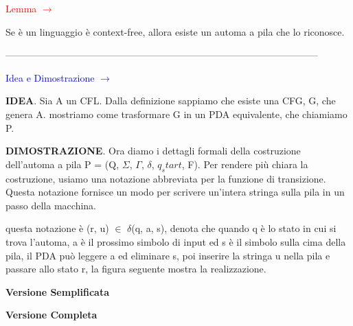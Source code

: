 \documentclass{article}
\begin{document}
\begin{center}
    \textcolor{red}{Lemma $\rightarrow$}
\end{center}

Se è un linguaggio è context-free, allora esiste un automa a pila che lo
riconosce.

--------------------------------------------------------------------------------------------------

\textcolor{blue}{Idea e Dimostrazione $\rightarrow$}

\textbf{IDEA}. Sia A un CFL. Dalla definizione sappiamo che esiste una CFG, G,
che genera A. mostriamo come trasformare G in un PDA equivalente, che chiamiamo
P.

\textbf{DIMOSTRAZIONE}. Ora diamo i dettagli formali della costruzione
\\dell'automa a pila P = (Q, $\Sigma$, $\Gamma$, $\delta$, $q_start$, F). Per
rendere più chiara la costruzione, usiamo una notazione abbreviata per la
funzione di transizione. Questa notazione fornisce un modo per scrivere
un'intera stringa sulla pila in un passo della macchina.

questa notazione è (r, u) $\in$ $\delta$(q, a, s), denota che quando q è lo
stato in cui si trova l'automa, a è il prossimo simbolo di input ed s è il
simbolo sulla cima della pila, il PDA può leggere a ed eliminare s, poi inserire
la stringa u nella pila e passare allo stato r, la figura seguente mostra la
realizzazione.

\begin{center}
    \textbf{Versione Semplificata}

\end{center}

\begin{center}
    \textbf{Versione Completa}

\end{center}
\end{document}
